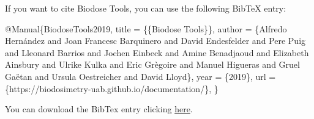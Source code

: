 \documentclass[]{scrartcl}
\newenvironment{Shaded}{\begin{snugshade}}{\end{snugshade}}
\newcommand{\NormalTok}[1]{#1}
\begin{document}
If you want to cite Biodose Tools, you can use the following BibTeX entry:

\begin{Shaded}
\begin{Highlighting}[]
\NormalTok{@Manual\{BiodoseTools2019,}
\NormalTok{  title = \{\{Biodose Tools\}\},}
\NormalTok{  author = \{Alfredo Hernández and Joan Francesc Barquinero and}
\NormalTok{            David Endesfelder and Pere Puig and Lleonard Barrios and}
\NormalTok{            Jochen Einbeck and Amine Benadjaoud and Elizabeth Ainsbury}
\NormalTok{            and Ulrike Kulka and Eric Grègoire and Manuel Higueras and }
\NormalTok{            Gruel Gaëtan and Ursula Oestreicher and David Lloyd\},}
\NormalTok{  year = \{2019\},}
\NormalTok{  url = \{https://biodosimetry-uab.github.io/documentation/\},}
\NormalTok{\}}
\end{Highlighting}
\end{Shaded}

You can download the BibTex entry clicking \href{https://biodosimetry-uab.github.io/documentation/data/biodose-tools.bib}{here}.

\hypertarget{refs}{}


\end{document}
